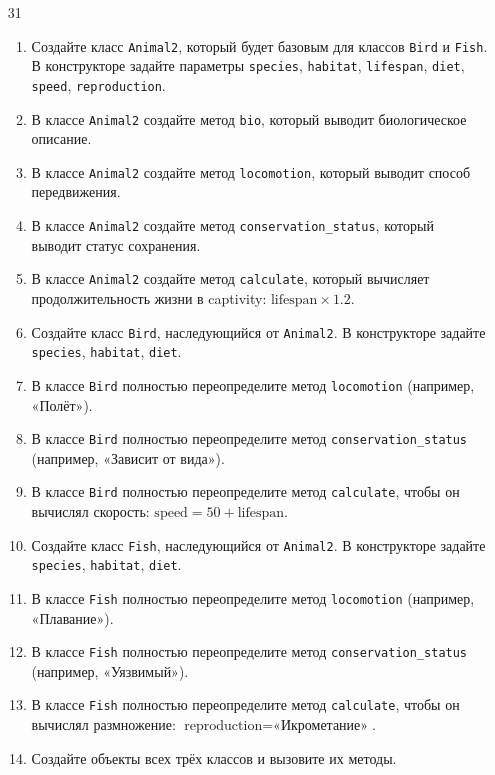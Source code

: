 \begin{enumerate}
\begin{enumerate}[leftmargin=*]
\end{enumerate}
\item[31]
\begin{enumerate}[leftmargin=*]
    \item Создайте класс \texttt{Animal2}, который будет базовым для классов \texttt{Bird} и \texttt{Fish}. В конструкторе задайте параметры \texttt{species}, \texttt{habitat}, \texttt{lifespan}, \texttt{diet}, \texttt{speed}, \texttt{reproduction}.
    \item В классе \texttt{Animal2} создайте метод \texttt{bio}, который выводит биологическое описание.
    \item В классе \texttt{Animal2} создайте метод \texttt{locomotion}, который выводит способ передвижения.
    \item В классе \texttt{Animal2} создайте метод \texttt{conservation\_status}, который выводит статус сохранения.
    \item В классе \texttt{Animal2} создайте метод \texttt{calculate}, который вычисляет продолжительность жизни в captivity: \( \text{lifespan} \times 1.2 \).
    \item Создайте класс \texttt{Bird}, наследующийся от \texttt{Animal2}. В конструкторе задайте \texttt{species}, \texttt{habitat}, \texttt{diet}.
    \item В классе \texttt{Bird} полностью переопределите метод \texttt{locomotion} (например, «Полёт»).
    \item В классе \texttt{Bird} полностью переопределите метод \texttt{conservation\_status} (например, «Зависит от вида»).
    \item В классе \texttt{Bird} полностью переопределите метод \texttt{calculate}, чтобы он вычислял скорость: \( \text{speed} = 50 + \text{lifespan} \).
    \item Создайте класс \texttt{Fish}, наследующийся от \texttt{Animal2}. В конструкторе задайте \texttt{species}, \texttt{habitat}, \texttt{diet}.
    \item В классе \texttt{Fish} полностью переопределите метод \texttt{locomotion} (например, «Плавание»).
    \item В классе \texttt{Fish} полностью переопределите метод \texttt{conservation\_status} (например, «Уязвимый»).
    \item В классе \texttt{Fish} полностью переопределите метод \texttt{calculate}, чтобы он вычислял размножение: \( \text{reproduction} = \text{«Икрометание»} \).
    \item Создайте объекты всех трёх классов и вызовите их методы.

\end{enumerate}
\end{enumerate}
